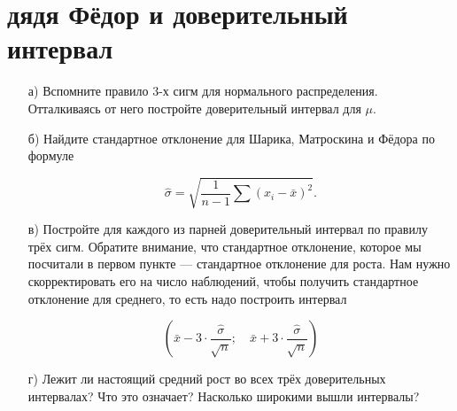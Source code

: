 \documentclass[12pt, a4paper, oneside]{article}
\begin{document}
\section{дядя Фёдор и доверительный интервал}
\begin{enumerate}
	
	\item[а)] Вспомните правило $3$-х сигм для нормального распределения. Отталкиваясь от него постройте доверительный интервал для $\mu$. 
	
	\item[б)] Найдите стандартное отклонение для Шарика, Матроскина и Фёдора по формуле 
	
	\[\hat \sigma = \sqrt{ \frac{1}{n-1}  \sum (x_i - \bar x)^2}.\]
	
	\item[в)] Постройте для каждого из парней доверительный интервал по правилу трёх сигм. Обратите внимание, что стандартное отклонение, которое мы посчитали в первом пункте --- стандартное отклонение для роста. Нам нужно скорректировать его на число наблюдений, чтобы получить стандартное отклонение для среднего, то есть надо построить интервал
	
	\[ \left( \bar x - 3 \cdot \frac{\hat \sigma}{\sqrt{n}}; \quad \bar x + 3 \cdot \frac{\hat \sigma}{\sqrt{n}} \right)\] 
	
	\item[г)] Лежит ли настоящий средний рост во всех трёх доверительных интервалах? Что это означает? Насколько широкими вышли интервалы? 
\end{enumerate}
\end{document}
